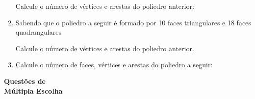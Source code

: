\documentclass[twocolumn,oneside,a4paper,12pt]{article}
\begin{document}
\begin{enumerate}

Calcule o número de vértices e arestas do poliedro anterior:

\item Sabendo que o poliedro a seguir é formado por 10 faces triangulares e 18 faces quadrangulares


Calcule o número de vértices e arestas do poliedro anterior.

\item Calcule o número de faces, vértices e arestas do poliedro a seguir:


\end{enumerate}

\newpage
\begin{center}
\textbf{Questões de\\Múltipla Escolha}
\end{center}
\end{document}
